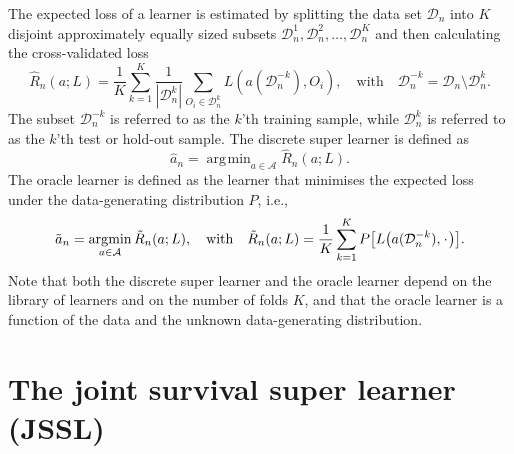 \documentclass[a4paper,danish]{article}
\theoremstyle{plain} %
\numberwithin{theorem}{section}
\theoremstyle{definition} %
\theoremstyle{remark}
\newcommand{\blank}{\makebox[1ex]{\textbf{$\cdot$}}}
\newcommand{\1}{\mathds{1}}
\DeclareMathOperator*{\argmin}{\arg\!\min}
\newcommand{\empmeas}{\ensuremath{\mathbb{P}_n}} %
\newcommand{\data}{\ensuremath{\mathcal{D}}}
\begin{document}
The expected loss of a learner is estimated by splitting the data set
$\data_n$ into $K$ disjoint approximately equally sized subsets
\(\data_n^1, \data_n^2, \dots, \data_n^K \) and then calculating the
cross-validated loss
\begin{equation*}
  \hat{R}_n(a; L) =
  \frac{1}{K}\sum_{k=1}^{K}
  \frac{1}{| \data_n^{k} |}\sum_{O_i \in \data_n^{k}}
  L
  {
    \left(
      a{ (\data_n^{-k})}
      , O_i
    \right)
  },
  \quad \text{with} \quad
  \data_n^{-k} = \data_n \setminus \data_n^{k}.
\end{equation*}
The subset \(\data_n^{-k}\) is referred to as the \(k\)'th training
sample, while \(\data_n^{k}\) is referred to as the \(k\)'th test or
hold-out sample.
The discrete super learner is defined as
\begin{equation*}
\hat{a}_n = \argmin_{a\in\mathcal A}\hat{R}_n(a; L).
\end{equation*}
The oracle learner is defined as the learner that minimises the
expected loss under the data-generating distribution \( P \),
i.e.,
\begin{equation*}
  \tilde{a}_n =
  \argmin_{a \in \mathcal{A}}
  \tilde{R}_n(a; L),
  \quad \text{with} \quad 
  \tilde{R}_n(a; L)=
  \frac{1}{K}\sum_{k=1}^{K} 
  P{
    \left[
      L
      {
        \left(
          a{ (\data_n^{-k})}
          , \blank
        \right)
      }
    \right]}
  .
\end{equation*}
Note that both the discrete super learner and the oracle learner
depend on the library of learners and on the number of folds \(K\),
and that the oracle learner is a function of the data and the unknown
data-generating distribution.

\section{The joint survival super learner (JSSL)}
\label{sec:super-learner-simple}
\end{document}
